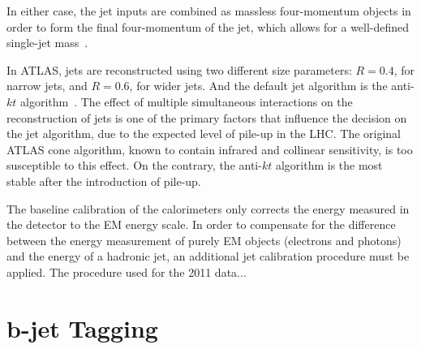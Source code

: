 In either case, the jet inputs are combined as massless four-momentum objects in order to form the final four-momentum of the jet, which allows for a well-defined single-jet mass~\cite{Busato:1271710}.


In ATLAS, jets are reconstructed using two different size parameters: $R = 0.4$, for narrow jets, and $R = 0.6$, for wider jets. And the default jet algorithm is the anti-$kt$ algorithm~\cite{Asquith:1311867}. The effect of multiple simultaneous interactions on the reconstruction of jets is one of the primary factors that influence the decision on the jet algorithm, due to the expected level of pile-up in the LHC. The original ATLAS cone algorithm, known to contain infrared and collinear sensitivity, is too susceptible to this effect. On the contrary, the anti-$kt$ algorithm is the most stable after the introduction of pile-up.  



The baseline calibration of the calorimeters only corrects the energy measured in the detector to the EM energy scale. In order to compensate for the difference between the energy measurement of purely EM objects (electrons and photons) and the energy of a hadronic jet, an additional jet calibration procedure must be applied.  The procedure used for the 2011 data...





\section{ $\bm b$-jet Tagging}\label{sec:btagging}


